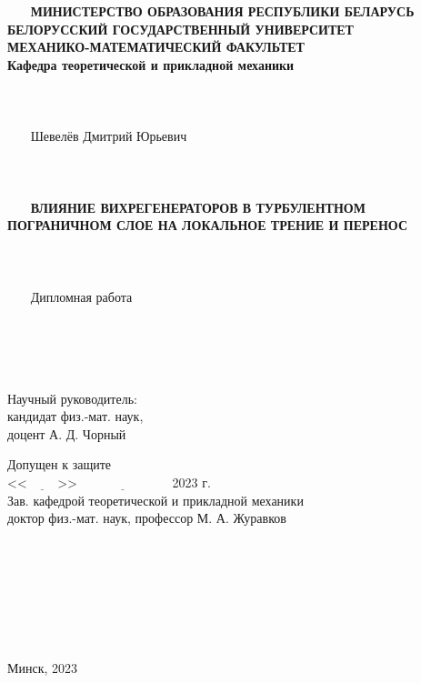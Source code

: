 \def\figurename{Рисунок}
\begin{titlepage}
	\begin{center}
		~~~
		\\
		~~~
		\\
		~~~
		\textbf{МИНИСТЕРСТВО ОБРАЗОВАНИЯ РЕСПУБЛИКИ БЕЛАРУСЬ\\
			БЕЛОРУССКИЙ ГОСУДАРСТВЕННЫЙ УНИВЕРСИТЕТ\\
			МЕХАНИКО-МАТЕМАТИЧЕСКИЙ ФАКУЛЬТЕТ\\
			Кафедра теоретической и прикладной механики\\}
		~~~
		\\
		~~~
		\\
		~~~
		\\
		~~~
		Шевелёв Дмитрий Юрьевич\\
		~~~
		\\
		~~~
		\\
		~~~
		\\
		~~~
		\textbf{ВЛИЯНИЕ ВИХРЕГЕНЕРАТОРОВ В ТУРБУЛЕНТНОМ ПОГРАНИЧНОМ СЛОЕ НА ЛОКАЛЬНОЕ ТРЕНИЕ И ПЕРЕНОС\\}
		~~~
		\\
		~~~
		\\
		~~~
		\\
		~~~
		Дипломная работа\\
		~~~
		\\
		~~~
		\\
		~~~
		\\
		~~~
	\end{center}
	\begin{flushright}
		Научный руководитель:\\
		кандидат физ.-мат. наук,\\
		доцент А. Д. Чорный\\
	\end{flushright}
	\begin{flushleft}
		Допущен к защите\\
		<<$\underline{\hspace{1cm}}$>>$\underline{\hspace{3cm}}$ 2023 г.\\
		Зав. кафедрой теоретической и прикладной механики\\
		доктор физ.-мат. наук, профессор М. А. Журавков
	\end{flushleft}
	~~~
	\\
	~~~
	\\
	~~~
	\\
	~~~
	\\
	~~~
	\\
	~~~
	\begin{center}
		Минск, 2023
	\end{center}
\end{titlepage}

